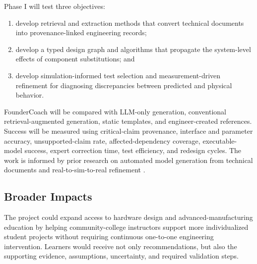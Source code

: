 \documentclass[12pt,letterpaper]{article}
\begin{document}
Phase I will test three objectives:

\begin{enumerate}
    \item develop retrieval and extraction methods that convert technical documents into provenance-linked engineering records;
    \item develop a typed design graph and algorithms that propagate the system-level effects of component substitutions; and
    \item develop simulation-informed test selection and measurement-driven refinement for diagnosing discrepancies between predicted and physical behavior.
\end{enumerate}

FounderCoach will be compared with LLM-only generation, conventional retrieval-augmented generation, static templates, and engineer-created references. Success will be measured using critical-claim provenance, interface and parameter accuracy, unsupported-claim rate, affected-dependency coverage, executable-model success, expert correction time, test efficiency, and redesign cycles. The work is informed by prior research on automated model generation from technical documents and real-to-sim-to-real refinement \cite{peng2025dochmet,torne2024reconciling}.

\subsection{Broader Impacts}

The project could expand access to hardware design and advanced-manufacturing education by helping community-college instructors support more individualized student projects without requiring continuous one-to-one engineering intervention. Learners would receive not only recommendations, but also the supporting evidence, assumptions, uncertainty, and required validation steps.
\end{document}
